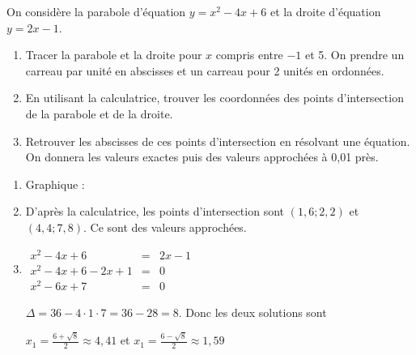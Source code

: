 \begin{exo}
On considère la parabole d'équation $y=x^2-4x+6$ et la droite d'équation $y=2x-1$.


\begin{enumerate}
\item Tracer la parabole et la droite pour $x$ compris entre $-1$ et 5. On prendre un carreau par unité en abscisses et un carreau pour 2 unités en ordonnées.

\item En utilisant la calculatrice, trouver les coordonnées des points d'intersection de la parabole et de la droite.

\item Retrouver les abscisses de ces points d'intersection en résolvant une équation. On donnera les valeurs exactes puis des valeurs approchées à 0,01 près.
\end{enumerate}

\begin{sol*}
\begin{enumerate}
\item Graphique : \par
\begin{image}
\end{image}

\item D'après la calculatrice, les points d'intersection sont $(1,6;2,2)$ et $(4,4;7,8)$. Ce sont des valeurs approchées.

\item 
$
\begin{array}{rcl}
x^2-4x+6 & = & 2x-1 \\
x^2-4x+6-2x+1 & = & 0 \\
x^2-6x+7 & = & 0
\end{array} 
$


$\Delta = 36-4 \cdot 1 \cdot 7 = 36-28 = 8$. Donc les deux solutions sont \par
$x_1 = \frac{6+\sqrt{8}}{2} \approx 4,41$ et $x_1 = \frac{6-\sqrt{8}}{2} \approx 1,59$ 

\end{enumerate}
\end{sol*}	

\end{exo}



